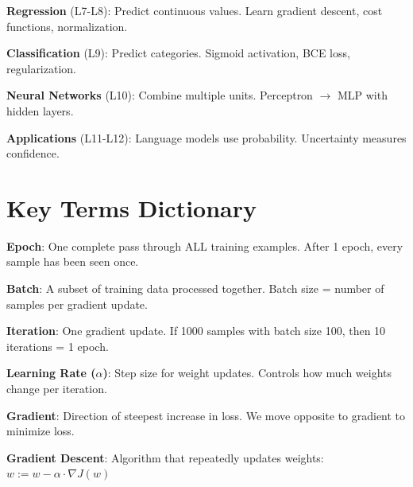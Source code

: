 \documentclass[11pt,a4paper]{article}
\begin{document}
\begin{center}
{%
}
\end{center}

\begin{notebox}
\textbf{Regression} (L7-L8): Predict continuous values. Learn gradient descent, cost functions, normalization.

\textbf{Classification} (L9): Predict categories. Sigmoid activation, BCE loss, regularization.

\textbf{Neural Networks} (L10): Combine multiple units. Perceptron $\to$ MLP with hidden layers.

\textbf{Applications} (L11-L12): Language models use probability. Uncertainty measures confidence.
\end{notebox}

\section{Key Terms Dictionary}

\begin{definitionbox}

\textbf{Epoch}: One complete pass through ALL training examples. After 1 epoch, every sample has been seen once.

\textbf{Batch}: A subset of training data processed together. Batch size = number of samples per gradient update.

\textbf{Iteration}: One gradient update. If 1000 samples with batch size 100, then 10 iterations = 1 epoch.

\textbf{Learning Rate ($\alpha$)}: Step size for weight updates. Controls how much weights change per iteration.

\textbf{Gradient}: Direction of steepest increase in loss. We move opposite to gradient to minimize loss.

\textbf{Gradient Descent}: Algorithm that repeatedly updates weights: $w := w - \alpha \cdot \nabla J(w)$
\end{definitionbox}
\end{document}
